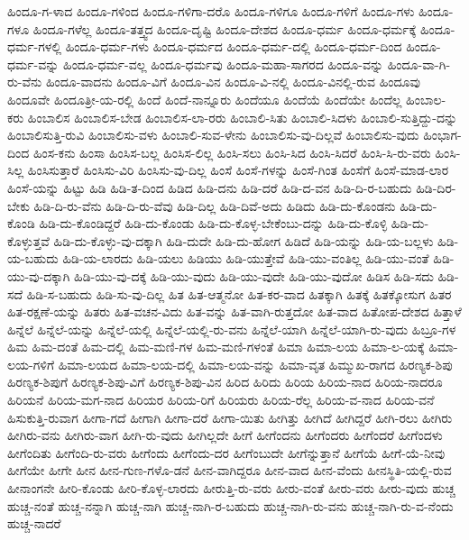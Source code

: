 {ಹಿಂದೂ-ಗ-ಳಾದ
ಹಿಂದೂ-ಗಳಿಂದ
ಹಿಂದೂ-ಗಳಿಗಾ-ದರೊ
ಹಿಂದೂ-ಗಳಿಗೂ
ಹಿಂದೂ-ಗಳಿಗೆ
ಹಿಂದೂ-ಗಳು
ಹಿಂದೂ-ಗಳೂ
ಹಿಂದೂ-ಗಳೆಲ್ಲ
ಹಿಂದೂ-ತತ್ತ್ವದ
ಹಿಂದೂ-ದೃಷ್ಟಿ
ಹಿಂದೂ-ದೇಶದ
ಹಿಂದೂ-ಧರ್ಮ
ಹಿಂದೂ-ಧರ್ಮಕ್ಕೆ
ಹಿಂದೂ-ಧರ್ಮ-ಗಳಲ್ಲಿ
ಹಿಂದೂ-ಧರ್ಮ-ಗಳು
ಹಿಂದೂ-ಧರ್ಮದ
ಹಿಂದೂ-ಧರ್ಮ-ದಲ್ಲಿ
ಹಿಂದೂ-ಧರ್ಮ-ದಿಂದ
ಹಿಂದೂ-ಧರ್ಮ-ವನ್ನು
ಹಿಂದೂ-ಧರ್ಮ-ವಲ್ಲ
ಹಿಂದೂ-ಧರ್ಮವು
ಹಿಂದೂ-ಮಹಾ-ಸಾಗರದ
ಹಿಂದೂ-ವನ್ನು
ಹಿಂದೂ-ವಾ-ಗಿ-ರು-ವೆನು
ಹಿಂದೂ-ವಾದನು
ಹಿಂದೂ-ವಿಗೆ
ಹಿಂದೂ-ವಿನ
ಹಿಂದೂ-ವಿ-ನಲ್ಲಿ
ಹಿಂದೂ-ವಿನಲ್ಲಿ-ರುವ
ಹಿಂದೂವು
ಹಿಂದೂವೇ
ಹಿಂದೂತ್ರೀ-ಯ-ರಲ್ಲಿ
ಹಿಂದೆ
ಹಿಂದೆ-ನಾನ್ನೂರು
ಹಿಂದೆಯೂ
ಹಿಂದೆಯೆ
ಹಿಂದೆಯೇ
ಹಿಂದೆಲ್ಲ
ಹಿಂಬಾಲ-ಕರು
ಹಿಂಬಾಲಿಸ
ಹಿಂಬಾಲಿಸ-ಬೇಡ
ಹಿಂಬಾಲಿಸ-ಲಾ-ರರು
ಹಿಂಬಾಲಿ-ಸಿತು
ಹಿಂಬಾಲಿ-ಸಿದಳು
ಹಿಂಬಾಲಿ-ಸುತ್ತಿದ್ದು-ದನ್ನು
ಹಿಂಬಾಲಿಸುತ್ತಿ-ರುವಿ
ಹಿಂಬಾಲಿಸು-ವಳು
ಹಿಂಬಾಲಿ-ಸುವ-ಳೇನು
ಹಿಂಬಾಲಿಸು-ವು-ದಿಲ್ಲವೆ
ಹಿಂಬಾಲಿಸು-ವುದು
ಹಿಂಭಾಗ-ದಿಂದ
ಹಿಂಸ-ಕನು
ಹಿಂಸಾ
ಹಿಂಸಿಸ-ಬಲ್ಲ
ಹಿಂಸಿಸ-ಲಿಲ್ಲ
ಹಿಂಸಿ-ಸಲು
ಹಿಂಸಿ-ಸಿದ
ಹಿಂಸಿ-ಸಿದರೆ
ಹಿಂಸಿ-ಸಿ-ರು-ವರು
ಹಿಂಸಿ-ಸಿಲ್ಲ
ಹಿಂಸಿಸುತ್ತಾರೆ
ಹಿಂಸಿಸು-ವಿರಿ
ಹಿಂಸಿಸು-ವು-ದಿಲ್ಲ
ಹಿಂಸೆ
ಹಿಂಸೆ-ಗಳನ್ನು
ಹಿಂಸೆ-ಗಿಂತ
ಹಿಂಸೆಗೆ
ಹಿಂಸೆ-ಮಾಡ-ಲಾರ
ಹಿಂಸೆ-ಯನ್ನು
ಹಿಟ್ಟು
ಹಿಡಿ
ಹಿಡಿ-ತ-ದಿಂದ
ಹಿಡಿದ
ಹಿಡಿ-ದನು
ಹಿಡಿ-ದರೆ
ಹಿಡಿ-ದ-ವನ
ಹಿಡಿ-ದಿ-ರ-ಬಹುದು
ಹಿಡಿ-ದಿರ-ಬೇಕು
ಹಿಡಿ-ದಿ-ರು-ವೆನು
ಹಿಡಿ-ದಿ-ರು-ವೆವು
ಹಿಡಿ-ದಿಲ್ಲ
ಹಿಡಿ-ದಿವೆ-ಅದು
ಹಿಡಿದು
ಹಿಡಿ-ದು-ಕೊಂಡನು
ಹಿಡಿ-ದು-ಕೊಂಡಿ
ಹಿಡಿ-ದು-ಕೊಂಡಿದ್ದರೆ
ಹಿಡಿ-ದು-ಕೊಂಡು
ಹಿಡಿ-ದು-ಕೊಳ್ಳ-ಬೇಕೆಂಬು-ದನ್ನು
ಹಿಡಿ-ದು-ಕೊಳ್ಳಿ
ಹಿಡಿ-ದು-ಕೊಳ್ಳುತ್ತವೆ
ಹಿಡಿ-ದು-ಕೊಳ್ಳು-ವು-ದಕ್ಕಾಗಿ
ಹಿಡಿ-ದುದೇ
ಹಿಡಿ-ದು-ಹೋಗ
ಹಿಡಿದೆ
ಹಿಡಿ-ಯನ್ನು
ಹಿಡಿ-ಯ-ಬಲ್ಲಳು
ಹಿಡಿ-ಯ-ಬಹುದು
ಹಿಡಿ-ಯ-ಲಾರದು
ಹಿಡಿ-ಯಲು
ಹಿಡಿಯು
ಹಿಡಿ-ಯುತ್ತೇವೆ
ಹಿಡಿ-ಯು-ವಂತಿಲ್ಲ
ಹಿಡಿ-ಯು-ವಂತೆ
ಹಿಡಿ-ಯು-ವು-ದಕ್ಕಾಗಿ
ಹಿಡಿ-ಯು-ವು-ದಕ್ಕೆ
ಹಿಡಿ-ಯು-ವುದು
ಹಿಡಿ-ಯು-ವುದೇ
ಹಿಡಿ-ಯು-ವುದೋ
ಹಿಡಿಸ
ಹಿಡಿ-ಸದು
ಹಿಡಿ-ಸದೆ
ಹಿಡಿ-ಸ-ಬಹುದು
ಹಿಡಿ-ಸು-ವು-ದಿಲ್ಲ
ಹಿತ
ಹಿತ-ಆತ್ಮನೋ
ಹಿತ-ಕರ-ವಾದ
ಹಿತಕ್ಕಾಗಿ
ಹಿತಕ್ಕೆ
ಹಿತಕ್ಕೋಸುಗ
ಹಿತರ
ಹಿತ-ರಕ್ಷಣೆ-ಯನ್ನು
ಹಿತರು
ಹಿತ-ವಚನ-ವಿದು
ಹಿತ-ವನ್ನು
ಹಿತ-ವಾಗಿ-ರುತ್ತದೋ
ಹಿತ-ವಾದ
ಹಿತೋಪ-ದೇಶದ
ಹಿತ್ತಾಳೆ
ಹಿನ್ನೆಲೆ
ಹಿನ್ನೆಲೆ-ಯನ್ನು
ಹಿನ್ನೆಲೆ-ಯಲ್ಲಿ
ಹಿನ್ನೆಲೆ-ಯಲ್ಲಿ-ರು-ವನು
ಹಿನ್ನೆಲೆ-ಯಾಗಿ
ಹಿನ್ನೆಲೆ-ಯಾಗಿ-ರು-ವುದು
ಹಿಬ್ರೂ-ಗಳ
ಹಿಮ
ಹಿಮ-ದಂತೆ
ಹಿಮ-ದಲ್ಲಿ
ಹಿಮ-ಮಣಿ-ಗಳ
ಹಿಮ-ಮಣಿ-ಗಳಂತೆ
ಹಿಮಾ
ಹಿಮಾ-ಲಯ
ಹಿಮಾ-ಲ-ಯಕ್ಕೆ
ಹಿಮಾ-ಲಯ-ಗಳಿಗೆ
ಹಿಮಾ-ಲಯದ
ಹಿಮಾ-ಲಯ-ದಲ್ಲಿ
ಹಿಮಾ-ಲಯ-ವನ್ನು
ಹಿಮಾ-ವೃತ
ಹಿಮ್ಮುಖ-ರಾಗದ
ಹಿರಣ್ಯಕ-ಶಿಪು
ಹಿರಣ್ಯಕ-ಶಿಪುಗೆ
ಹಿರಣ್ಯಕ-ಶಿಪು-ವಿಗೆ
ಹಿರಣ್ಯಕ-ಶಿಪು-ವಿನ
ಹಿರಿದ
ಹಿರಿದು
ಹಿರಿಯ
ಹಿರಿಯ-ನಾದ
ಹಿರಿಯ-ನಾದರೂ
ಹಿರಿಯನೆ
ಹಿರಿಯ-ಮಗ-ನಾದ
ಹಿರಿಯರ
ಹಿರಿಯ-ರಿಗೆ
ಹಿರಿಯರು
ಹಿರಿಯ-ರೆಲ್ಲ
ಹಿರಿಯ-ವ-ನಾದ
ಹಿರಿಯ-ವನೆ
ಹಿಸುಕುತ್ತಿ-ರುವಾಗ
ಹೀಗಾ-ಗದೆ
ಹೀಗಾಗಿ
ಹೀಗಾ-ದರೆ
ಹೀಗಾ-ಯಿತು
ಹೀಗಿತ್ತು
ಹೀಗಿದೆ
ಹೀಗಿದ್ದರೆ
ಹೀಗಿ-ರಲು
ಹೀಗಿರು
ಹೀಗಿರು-ವನು
ಹೀಗಿರು-ವಾಗ
ಹೀಗಿ-ರು-ವುದು
ಹೀಗಿಲ್ಲದೇ
ಹೀಗೆ
ಹೀಗೆಂದನು
ಹೀಗೆಂದರು
ಹೀಗೆಂದರೆ
ಹೀಗೆಂದಳು
ಹೀಗೆಂದಿತು
ಹೀಗೆಂದಿ-ರು-ವರು
ಹೀಗೆಂದು
ಹೀಗೆಂದು-ದರ
ಹೀಗೆಂಬುದೇ
ಹೀಗೆನ್ನುತ್ತಾನೆ
ಹೀಗೆಯೆ
ಹೀಗೆ-ಯೆ-ನೀವು
ಹೀಗೆಯೇ
ಹೀಗೇ
ಹೀನ
ಹೀನ-ಗುಣ-ಗಳೊ-ಡನೆ
ಹೀನ-ವಾಗಿದ್ದರೂ
ಹೀನ-ವಾದ
ಹೀನ-ವೆಂದು
ಹೀನಸ್ಥಿತಿ-ಯಲ್ಲಿ-ರುವ
ಹೀನಾಂಗನೇ
ಹೀರಿ-ಕೊಂಡು
ಹೀರಿ-ಕೊಳ್ಳ-ಲಾರದು
ಹೀರುತ್ತಿ-ರು-ವರು
ಹೀರು-ವಂತೆ
ಹೀರು-ವರು
ಹೀರು-ವುದು
ಹುಚ್ಚ
ಹುಚ್ಚ-ನಂತೆ
ಹುಚ್ಚ-ನನ್ನಾಗಿ
ಹುಚ್ಚ-ನಾಗಿ
ಹುಚ್ಚ-ನಾಗಿ-ರ-ಬಹುದು
ಹುಚ್ಚ-ನಾಗಿ-ರು-ವನು
ಹುಚ್ಚ-ನಾಗಿ-ರು-ವ-ನೆಂದು
ಹುಚ್ಚ-ನಾದರೆ
}
